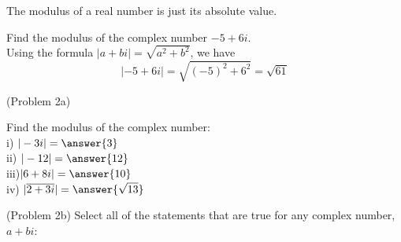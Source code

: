 \documentclass[handout]{ximera}
\begin{document}
\begin{remark}
The modulus of a real number is just its absolute value.
\end{remark}

\begin{image}
\end{image}

\begin{example}[Example 2]
Find the modulus of the complex number $-5+6i$.\\
Using the formula $|a+bi| =\sqrt{a^2+b^2}$, we have
\[
|-5+6i| = \sqrt{(-5)^2 + 6^2} = \sqrt{61}
\]
\end{example}

\begin{problem}(Problem 2a)

Find the modulus of the complex number:\\
i)  \quad $\displaystyle |-3i| = \answer{3}$\\
ii) \quad $\displaystyle |-12| = \answer{12}$ \\
iii)\quad $\displaystyle |6+8i| = \answer{10}$ \\
iv) \quad $\displaystyle |\overline{2+3i}| = \answer{\sqrt{13}}$


\end{problem}

\begin{problem}(Problem 2b)
Select all of the statements that are true for any complex number, $a+bi$:
\begin{selectAll}
\end{selectAll}

\end{problem}
\end{document}
